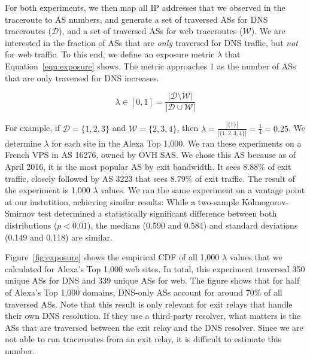 For both experiments, we then map all IP addresses that we observed in the
traceroute to AS numbers, and generate a set of traversed ASs for DNS
traceroutes ($\mathcal{D}$), and a set of traversed ASs for web traceroutes
($\mathcal{W}$).  We are interested in the fraction of ASs that are \emph{only}
traversed for DNS traffic, but \emph{not} for web traffic.  To this end, we
define an exposure metric $\lambda$ that Equation~\ref{equ:exposure} shows.  The
metric approaches 1 as the number of ASs that are only traversed for DNS
increases.

\begin{equation}
\label{equ:exposure}
\lambda \in [0, 1] =
\frac{|\mathcal{D} \setminus \mathcal{W}|}
     {|\mathcal{D} \cup \mathcal{W}|}
\end{equation}

For example, if $\mathcal{D} = \{1,2,3\}$ and $\mathcal{W} = \{2,3,4\}$, then
$\lambda = \frac{|\{1\}|}{|\{1,2,3,4\}|} = \frac{1}{4} = 0.25$.  We determine
$\lambda$ for each site in the Alexa Top 1,000.  We ran these experiments on a
French VPS in AS 16276, owned by OVH SAS.  We chose this AS because as of April
2016, it is the most popular AS by exit bandwidth.  It sees $8.88\%$ of exit
traffic, closely followed by AS 3223 that sees $8.79\%$ of exit traffic.  The
result of the experiment is 1,000 $\lambda$ values.  We ran the same experiment
on a vantage point at our instutition, achieving similar results: While a
two-sample Kolmogorov-Smirnov test determined a statistically significant
difference between both distributions ($p < 0.01$), the medians (0.590 and
0.584) and standard deviations (0.149 and 0.118) are similar.

Figure~\ref{fig:exposure} shows the empirical CDF of all 1,000 $\lambda$ values
that we calculated for Alexa's Top 1,000 web sites.  In total, this experiment
traversed 350 unique ASs for DNS and 339 unique ASs for web.  The figure shows
that for half of Alexa's Top 1,000 domains, DNS-only ASs account for around 70\%
of all traversed ASs.  Note that this result is only relevant for exit relays
that handle their own DNS resolution.  If they use a third-party resolver, what
matters is the ASs that are traversed between the exit relay and the DNS
resolver.  Since we are not able to run traceroutes from an exit relay, it is
difficult to estimate this number.


